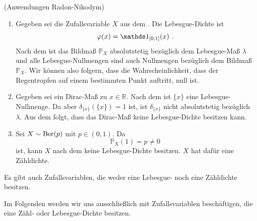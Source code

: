 \begin{Beispiel}{(Anwendungen Radon-Nikodym)}
\begin{enumerate}[label=(\roman*)]
\item Gegeben sei die Zufallsvariable $X$ aus dem \hyperlink{Bsp:Regen}{}. Die Lebesgue-Dichte ist
\[\varphi(x) = \indi_{[0, 1]}(x)~.\]
Nach dem \hyperlink{Satz:Radon-Nikodym}{} ist das Bildmaß $\mathbb{P}_X$ absolutstetig bezüglich dem Lebesgue-Maß $\lambda$ und alle Lebesgue-Nullmengen sind auch Nullmengen bezüglich dem Bildmaß $\mathbb{P}_X$. Wir können also folgern, dass die Wahrscheinlichkeit, dass der Regentropfen auf einem bestimmten Punkt auftritt, null ist.

\item Gegeben sei ein Dirac-Maß zu $x \in \mathbb{R}$. Nach dem \hyperlink{Bsp:Nullmenge}{} ist $\{x\}$ eine Lebesgue-Nullmenge. Da aber $\delta_{\{x\}}(\{x\}) = 1$ ist, ist $\delta_{\{x\}}$ nicht absolutstetig bezüglich $\lambda$. Aus dem \hyperlink{Satz:Radon-Nikodym}{} folgt, dass das Dirac-Maß keine Lebesgue-Dichte besitzen kann.

\item Sei $X \sim \operatorname{Ber}(p)$ mit $p \in (0, 1)$. Da
\[\mathbb{P}_X(1) = p \neq 0\]
ist, kann $X$ nach dem \hyperlink{Satz:Radon-Nikodym}{} keine Lebesgue-Dichte besitzen. $X$ hat dafür eine Zähldichte.
\end{enumerate}
Es gibt auch Zufallsvariablen, die weder eine Lebesgue- noch eine Zähldichte besitzen.
\end{Beispiel}

Im Folgenden werden wir uns ausschließlich mit Zufallsvariablen beschäftigen, die eine Zähl- oder Lebesgue-Dichte besitzen.